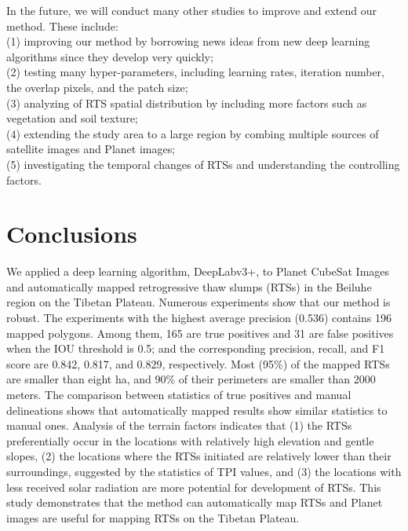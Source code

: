 \documentclass[preprint,12pt,authoryear]{elsarticle}
\begin{document}
In the future, we will conduct many other studies to improve and extend our method. These include:\\
 (1) improving our method by borrowing news ideas from new deep learning algorithms since they develop very quickly;\\ 
(2) testing many hyper-parameters, including learning rates, iteration number, the overlap pixels, and the patch size; \\
(3) analyzing of RTS spatial distribution by including more factors such as vegetation and soil texture;\\
(4) extending the study area to a large region by combing multiple sources of satellite images and Planet images; \\
(5) investigating the temporal changes of RTSs and understanding the controlling factors.


\section{Conclusions}
\label{sec_conclusion}

We applied a deep learning algorithm, DeepLabv3+, to Planet CubeSat Images and automatically mapped retrogressive thaw slumps (RTSs) in the Beiluhe region on the Tibetan Plateau. Numerous experiments show that our method is robust. The experiments with the highest average precision (0.536) contains 196 mapped polygons. Among them, 165 are true positives and 31 are false positives when the IOU threshold is 0.5; and the corresponding precision, recall, and F1 score are 0.842, 0.817, and 0.829, respectively. Most (95\%) of the mapped RTSs are smaller than eight ha, and 90\% of their perimeters are smaller than 2000 meters. The comparison between statistics of true positives and manual delineations shows that automatically mapped results show similar statistics to manual ones. Analysis of the terrain factors indicates that (1) the RTSs preferentially occur in the locations with relatively high elevation and gentle slopes, (2) the locations where the RTSs initiated are relatively lower than their surroundings, suggested by the statistics of TPI values, and (3) the locations with less received solar radiation are more potential for development of RTSs. This study demonstrates that the method can automatically map RTSs and Planet images are useful for mapping RTSs on the Tibetan Plateau. 
 
\end{document}
